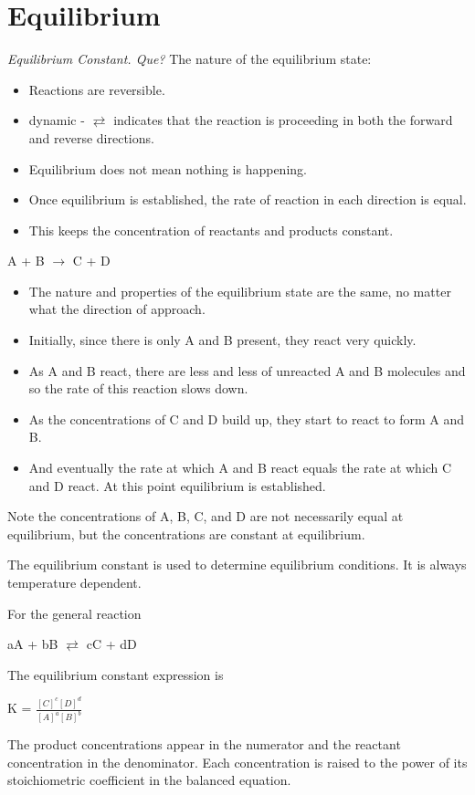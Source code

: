 \documentclass[../hchem.tex]{subfiles}
\begin{document}
\chapter{Equilibrium}
\textit{Equilibrium Constant. Que?}
The nature of the equilibrium state:
\begin{itemize}
    \item Reactions are reversible.
    \item dynamic - $\rightleftarrows$ indicates that the reaction is proceeding in both the forward and reverse directions.
    \item Equilibrium does not mean nothing is happening.
    \item Once equilibrium is established, the rate of reaction in each direction is equal.
    \item This keeps the concentration of reactants and products constant.
\end{itemize}

\begin{center}
    A + B $\rightarrow$ C + D 
\end{center}
\begin{itemize}
    \item The nature and properties of the equilibrium state are the same, no matter what the direction of approach.
    \item Initially, since there is only A and B present, they react very quickly.
    \item As A and B react, there are less and less of unreacted A and B molecules and so the rate of this reaction slows down.
    \item As the concentrations of C and D build up, they start to react to form A and B.
    \item And eventually the rate at which A and B react equals the rate at which C and D react. At this point equilibrium is established.
\end{itemize}
Note the concentrations of A, B, C, and D are not necessarily equal at equilibrium, but the concentrations are constant at equilibrium.

The equilibrium constant is used to determine equilibrium conditions. It is always temperature dependent.

For the general reaction 
\begin{center}
    aA + bB $\rightleftarrows$ cC + dD 
\end{center}
The equilibrium constant expression is 
\begin{center}
    K = $\frac{[C]^c[D]^d}{[A]^a[B]^b}$
\end{center}
The product concentrations appear in the numerator and the reactant concentration in the denominator.
Each concentration is raised to the power of its stoichiometric coefficient in the balanced equation.
\end{document}
